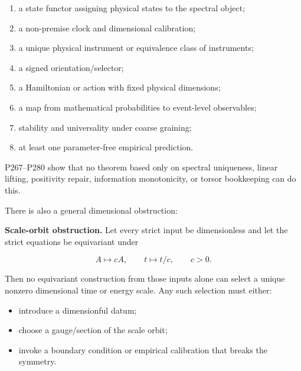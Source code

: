 \documentclass[11pt,a4paper,openany]{report}
\begin{document}
\begin{enumerate}
\item 
a state functor assigning physical states to the spectral object;

\item 
a non-premise clock and dimensional calibration;

\item 
a unique physical instrument or equivalence class of instruments;

\item 
a signed orientation/\allowbreak{}selector;

\item 
a Hamiltonian or action with fixed physical dimensions;

\item 
a map from mathematical probabilities to event-level observables;

\item 
stability and universality under coarse graining;

\item 
at least one parameter-free empirical prediction.

\end{enumerate}

P267--P280 show that no theorem based only on spectral uniqueness, linear lifting, positivity repair, information monotonicity, or torsor bookkeeping can do this.

There is also a general dimensional obstruction:

\textbf{Scale-orbit obstruction.} Let every strict input be dimensionless and let the strict equations be equivariant under

\[
A\mapsto cA,\qquad t\mapsto t/c,\qquad c>0.
\]

Then no equivariant construction from those inputs alone can select a unique nonzero dimensional time or energy scale. Any such selection must either:

\begin{itemize}
\item 
introduce a dimensionful datum;

\item 
choose a gauge/\allowbreak{}section of the scale orbit;

\item 
invoke a boundary condition or empirical calibration that breaks the symmetry.

\end{itemize}
\end{document}
